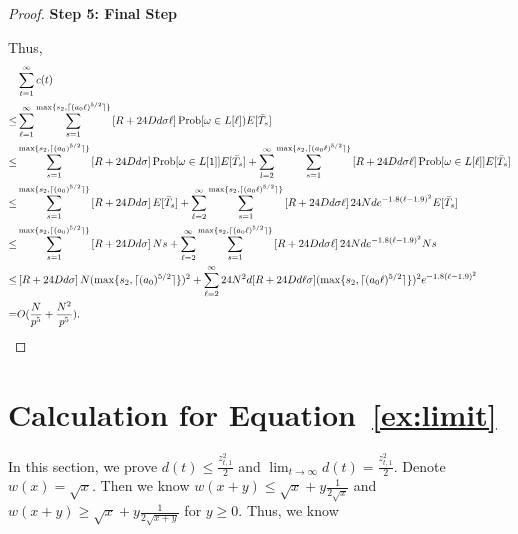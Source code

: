 \begin{proof}
\noindent\textbf{Step 5: Final Step}

Thus,
\begin{align}
&\sum_{t=1}^{\infty}c(t) \nonumber \\
\leq&\sum_{\ell=1}^{\infty}\sum_{s=1}^{\max\{s_2,\lceil (a_0 \ell)^{5/2} \rceil\}}\left[\MAXR+24\Diam d\sigma \ell\right]\Prob{\omega\in L[\ell])E[\bar{T}_{s}} \nonumber \\
\leq& \sum_{s=1}^{\max\{s_2,\lceil (a_0)^{5/2} \rceil\}}\left[\MAXR+24\Diam d\sigma \right]\Prob{\omega\in L[1]}E[\bar{T}_{s}] +\sum_{l=2}^{\infty}\sum_{s=1}^{\max\{s_2,\lceil (a_0 \ell)^{5/2} \rceil\}}\left[\MAXR+24\Diam d\sigma \ell\right]\Prob{\omega\in L[\ell]}E[\bar{T}_{s}] \nonumber \\
\leq& \sum_{s=1}^{\max\{s_2,\lceil (a_0)^{5/2} \rceil\}}\left[R+24\Diam d\sigma \right]E[\bar{T}_{s}] +\sum_{\ell=2}^{\infty}\sum_{s=1}^{\max\{s_2,\lceil (a_0 \ell)^{5/2} \rceil\}}\left[\MAXR+24\Diam d\sigma \ell\right]24\ARMNUM d e^{-1.8(\ell-1.9)^2}E[\bar{T}_{s}]\nonumber \\
\leq& \sum_{s=1}^{\max\{s_2,\lceil (a_0)^{5/2} \rceil\}}\left[\MAXR+24\Diam d\sigma \right]\ARMNUM s +\sum_{\ell=2}^{\infty}\sum_{s=1}^{\max\{s_2,\lceil (a_0 \ell)^{5/2} \rceil\}}\left[\MAXR+24\Diam d\sigma \ell\right]24 \ARMNUM d e^{-1.8(\ell-1.9)^2}\ARMNUM s \nonumber \\
\leq & \left[\MAXR+24\Diam d\sigma \right]\ARMNUM (\max\{s_2,\lceil (a_0)^{5/2} \rceil\})^2+\sum_{\ell=2}^{\infty}24\ARMNUM^2 d[\MAXR+24\Diam d\ell\sigma](\max\{s_2,\lceil (a_0 \ell)^{5/2} \rceil\})^2 e^{-1.8(\ell-1.9)^2} \nonumber \\
=& O(\frac{N}{\MinProb^5}+ \frac{\ARMNUM^2}{\MinProb^5}). \nonumber
\end{align}

\end{proof}

\section*{Calculation for Equation~\eqref{ex:limit}}

In this section, we prove $d(t)\leq \frac{z_{t,1}^{2}}{2}$ and $\lim_{t\rightarrow\infty}d(t)=\frac{z_{t,1}^2}{2}$. Denote $w(x)=\sqrt{x}$. Then we know $w(x+y)\leq \sqrt{x} + y\frac{1}{2\sqrt{x}}$ and $w(x+y)\geq \sqrt{x} + y\frac{1}{2\sqrt{x+y}}$ for $y\geq 0$. Thus, we know

